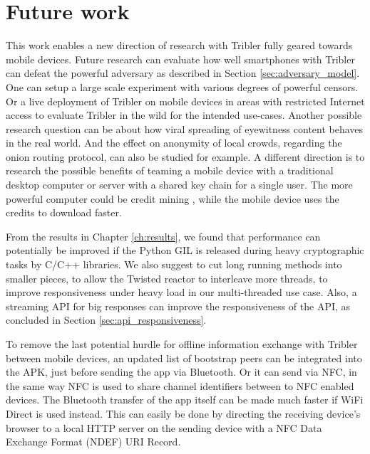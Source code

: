 \section{Future work}\label{sec:future_work}
This work enables a new direction of research with Tribler fully geared towards mobile devices.
Future research can evaluate how well smartphones with Tribler can defeat the powerful adversary as described in Section \ref{sec:adversary_model}.
One can setup a large scale experiment with various degrees of powerful censors.
Or a live deployment of Tribler on mobile devices in areas with restricted Internet access to evaluate Tribler in the wild for the intended use-cases.
Another possible research question can be about how viral spreading of eyewitness content behaves in the real world.
And the effect on anonymity of local crowds, regarding the onion routing protocol, can also be studied for example.
A different direction is to research the possible benefits of teaming a mobile device with a traditional desktop computer or server with a shared key chain for a single user.
The more powerful computer could be credit mining \cite{decentralized_credit_mining}, while the mobile device uses the credits to download faster.

From the results in Chapter \ref{ch:results}, we found that performance can potentially be improved if the Python GIL is released during heavy cryptographic tasks by C/C++ libraries.
We also suggest to cut long running methods into smaller pieces, to allow the Twisted reactor to interleave more threads, to improve responsiveness under heavy load in our multi-threaded use case.
Also, a streaming API for big responses can improve the responsiveness of the API, as concluded in Section \ref{sec:api_responsiveness}.

To remove the last potential hurdle for offline information exchange with Tribler between mobile devices, an updated list of bootstrap peers can be integrated into the APK, just before sending the app via Bluetooth.
Or it can send via NFC, in the same way NFC is used to share channel identifiers between to NFC enabled devices.
The Bluetooth transfer of the app itself can be made much faster if WiFi Direct is used instead.
This can easily be done by directing the receiving device's browser to a local HTTP server on the sending device with a NFC Data Exchange Format (NDEF) URI Record.

